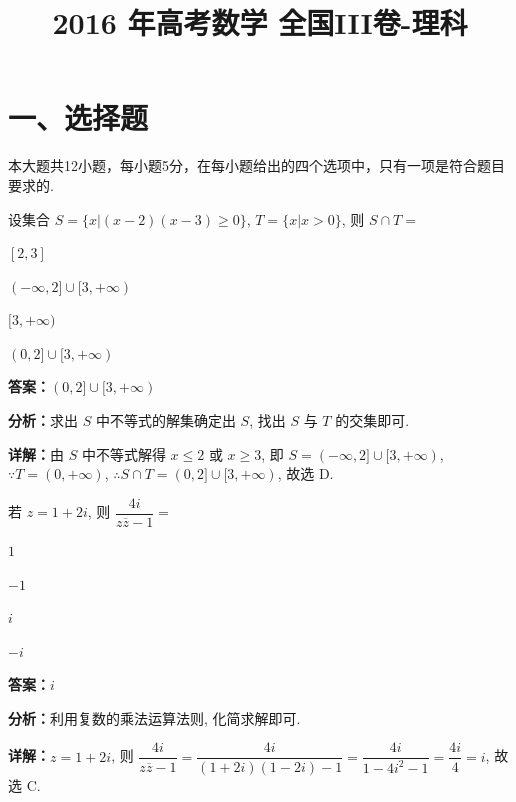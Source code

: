﻿\title{2016 年高考数学 全国III卷-理科}
\date{}
\maketitle

\section*{一、选择题}
本大题共12小题，每小题5分，在每小题给出的四个选项中，只有一项是符合题目要求的.

\begin{question}[points=5]
设集合 $S=\{x|(x-2)(x-3)\ge 0\}$, $T=\{x|x>0\}$, 则 $S\cap T=$
\begin{choices}
  \item $[2,3]$
  \item $(-\infty,2]\cup[3,+\infty)$
  \item $[3,+\infty)$
  \item $(0,2]\cup[3,+\infty)$
\end{choices}
\begin{solution}
\textbf{答案：}$(0,2]\cup[3,+\infty)$

\textbf{分析：}求出 $S$ 中不等式的解集确定出 $S$, 找出 $S$ 与 $T$ 的交集即可.

\textbf{详解：}由 $S$ 中不等式解得 $x\le 2$ 或 $x\ge 3$, 即 $S=(-\infty,2]\cup[3,+\infty)$, $\because T=(0,+\infty)$, $\therefore S\cap T=(0,2]\cup[3,+\infty)$, 故选 D.
\end{solution}
\end{question}

\begin{question}[points=5]
若 $z=1+2i$, 则 $\dfrac{4i}{z\overline{z}-1}=$
\begin{choices}
  \item $1$
  \item $-1$
  \item $i$
  \item $-i$
\end{choices}
\begin{solution}
\textbf{答案：}$i$

\textbf{分析：}利用复数的乘法运算法则, 化简求解即可.

\textbf{详解：}$z=1+2i$, 则 $\dfrac{4i}{z\overline{z}-1}=\dfrac{4i}{(1+2i)(1-2i)-1}=\dfrac{4i}{1-4i^2-1}=\dfrac{4i}{4}=i$, 故选 C.
\end{solution}
\end{question}

